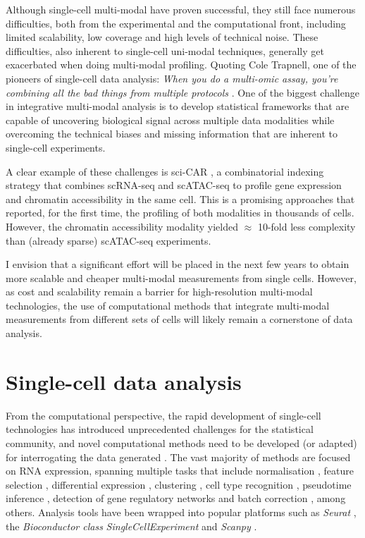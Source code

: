 Although single-cell multi-modal have proven successful, they still face numerous difficulties, both from the experimental and the computational front, including limited scalability, low coverage and high levels of technical noise. These difficulties, also inherent to single-cell uni-modal techniques, generally get exacerbated when doing multi-modal profiling. Quoting Cole Trapnell, one of the pioneers of single-cell data analysis: \textit{When you do a multi-omic assay, you're combining all the bad things from multiple protocols} \cite{Eisenstein2020}. One of the biggest challenge in integrative multi-modal analysis is to develop statistical frameworks that are capable of uncovering biological signal across multiple data modalities while overcoming the technical biases and missing information that are inherent to single-cell experiments. 

A clear example of these challenges is sci-CAR \cite{Cao2018a}, a combinatorial indexing strategy that combines scRNA-seq and scATAC-seq to profile gene expression and chromatin accessibility in the same cell. This is a promising approaches that reported, for the first time, the profiling of both modalities in thousands of cells. However, the  chromatin accessibility modality yielded $\approx$ 10-fold less complexity than (already sparse) scATAC-seq experiments.

I envision that a significant effort will be placed in the next few years to obtain more scalable and cheaper multi-modal measurements from single cells. However, as cost and scalability remain a barrier for high-resolution multi-modal technologies, the use of computational methods that integrate multi-modal measurements from different sets of cells will likely remain a cornerstone of data analysis.


\section{Single-cell data analysis}

From the computational perspective, the rapid development of single-cell technologies has introduced unprecedented challenges for the statistical community, and novel computational methods need to be developed (or adapted) for interrogating the data generated \cite{Stegle2015}. The vast majority of methods are focused on RNA expression, spanning multiple tasks that include normalisation \cite{Lun2016a}, feature selection \cite{Townes2019}, differential expression \cite{Kharchenko2014}, clustering \cite{Kiselev2017}, cell type recognition \cite{Abdelaal2019}, pseudotime inference \cite{Haghverdi2016}, detection of gene regulatory networks \cite{Aibar2017} and batch correction \cite{Haghverdi2018}, among others. Analysis tools have been wrapped into popular platforms such as \textit{Seurat} \cite{Butler2018}, the \textit{Bioconductor class} \textit{SingleCellExperiment} \cite{Amezquita2020} and \textit{Scanpy} \cite{Wolf2018}.

